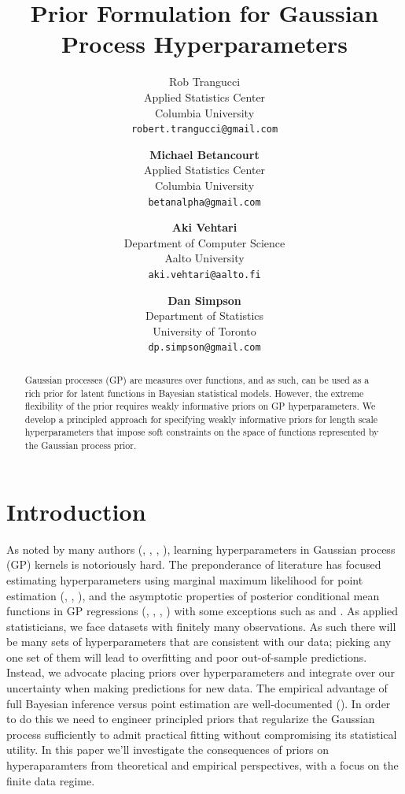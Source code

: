 \documentclass{article}
\title{Prior Formulation for Gaussian Process Hyperparameters}
\author{
  Rob Trangucci \\
  Applied Statistics Center\\
  Columbia University\\
  \texttt{robert.trangucci@gmail.com} 
  \and
  \textbf{Michael Betancourt} \\
  Applied Statistics Center \\
  Columbia University \\
  \texttt{betanalpha@gmail.com} 
  \and
  \textbf{Aki Vehtari} \\
  Department of Computer Science \\
  Aalto University \\
  \texttt{aki.vehtari@aalto.fi} 
  \and
  \textbf{Dan Simpson} \\
  Department of Statistics \\
  University of Toronto \\
  \texttt{dp.simpson@gmail.com} 
}
\begin{document}

\maketitle

\begin{abstract}
  Gaussian processes (GP) are measures over functions, and as such, can be used
  as a rich prior for latent functions in Bayesian statistical models. However,
  the extreme flexibility of the prior requires weakly informative priors on GP
  hyperparameters. We develop a principled approach for specifying weakly
  informative priors for length scale hyperparameters that impose soft
  constraints on the space of functions represented by the Gaussian process
  prior.
\end{abstract}


\section{Introduction}

As noted by many authors (\citet{flaxman2015fast},
\citet{stein2012interpolation}, \citet{rasmussen2005gaussian},
\citet{fuglstad2015interpretable}), learning hyperparameters in Gaussian
process (GP) kernels is notoriously hard. The preponderance of literature has
focused estimating hyperparameters using marginal maximum likelihood for point
estimation (\citet{stein2012interpolation}, \citet{rasmussen2005gaussian},
\citet{warnes1987problems}), and the asymptotic properties of posterior
conditional mean functions in GP regressions (\citet{seeger2008information},
\citet{stein2012interpolation}, \citet{rasmussen2005gaussian},
\citet{williams2000upper}) with some exceptions such as
\citet{neal1998regression} and \citet{vanhatalo2013gpstuff}. As applied
statisticians, we face datasets with finitely many observations. As such there
will be many sets of hyperparameters that are consistent with our data; picking
any one set of them will lead to overfitting and poor out-of-sample
predictions. Instead, we advocate placing priors over hyperparameters and
integrate over our uncertainty when making predictions for new data. The
empirical advantage of full Bayesian inference versus point estimation are
well-documented (\citet{vehtariloo}). 
In order to do this we need to engineer principled priors that regularize the
Gaussian process sufficiently to admit practical fitting without compromising
its statistical utility. In this paper we'll investigate the consequences of
priors on hyperaparamters from theoretical and empirical perspectives, with a
focus on the finite data regime.
\end{document}
